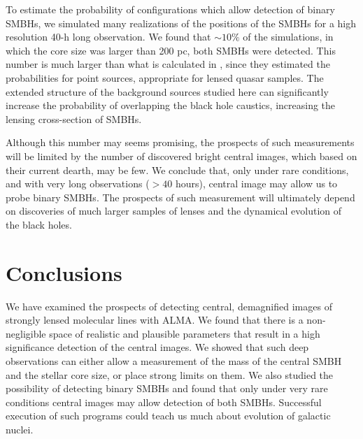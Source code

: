 \documentclass[chicago]{emulateapj}
\begin{document}
To estimate the probability of configurations which allow detection of binary SMBHs, we simulated many realizations of the positions of the SMBHs for a high resolution 40-h long observation. 
We found that $\sim10\%$ of the simulations, in which the core size was larger than 200 pc, both SMBHs were detected. 
This number is much larger than what is calculated in \citet{Li:12}, since they estimated  the probabilities for point sources, appropriate for lensed quasar samples. The extended structure of the background sources studied here can significantly increase the probability of overlapping the black hole caustics, increasing the lensing cross-section of SMBHs.

  Although this number may seems promising, the prospects of such measurements will be limited by the number of discovered bright central images, which based on their current dearth, may be few. We conclude that, only under rare conditions, and with very long observations ($>40$ hours), central image may allow us to probe binary SMBHs. The prospects of such measurement will ultimately depend on discoveries of much larger samples of lenses and the dynamical evolution of the black holes.






\section{Conclusions}
We have examined the prospects of detecting central, demagnified images of strongly lensed molecular lines with ALMA. We found that there is a non-negligible space of realistic and plausible parameters that result in a high significance detection of the central images. We showed that such deep observations can either allow a measurement of the mass of the central SMBH and the stellar core size, or place strong limits on them.
We also studied the possibility of detecting binary SMBHs and found that only under very rare conditions central images may allow detection of both SMBHs. Successful execution of such programs could teach us much about evolution of galactic nuclei.





\end{document}
